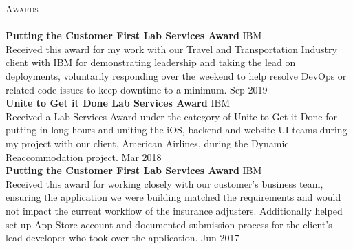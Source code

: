 \documentclass[a4paper]{article}
\newcommand{\lineunder} {
    \vspace*{-8pt} \\
    \hspace*{-18pt} \hrulefill \\
}
\newcommand{\header} [1] {
    {\hspace*{-18pt}\vspace*{6pt} \textsc{#1}}
    \vspace*{-6pt} \lineunder
}
\begin{document}
\header{Awards}
\textbf{Putting the Customer First Lab Services Award} \hfill IBM\\
Received this award for my work with our Travel and Transportation Industry client with IBM for demonstrating leadership and taking the lead on deployments, voluntarily responding over the weekend to help resolve DevOps or related code issues to keep downtime to a minimum. \hfill Sep 2019\\
\vspace*{2mm}
\textbf{Unite to Get it Done Lab Services Award} \hfill IBM\\
Received a Lab Services Award under the category of \textquotedbl{}Unite to Get it Done\textquotedbl{} for putting in long hours and uniting the iOS, backend and website UI teams during my project with our client, American Airlines, during the Dynamic Reaccommodation project. \hfill Mar 2018\\
\vspace*{2mm}
\textbf{Putting the Customer First Lab Services Award} \hfill IBM\\
Received this award for working closely with our customer’s business team, ensuring the application we were building matched the requirements and would not impact the current workflow of the insurance adjusters. Additionally helped set up App Store account and documented submission process for the client’s lead developer who took over the application. \hfill Jun 2017\\
\vspace*{2mm}

\ 
\end{document}
